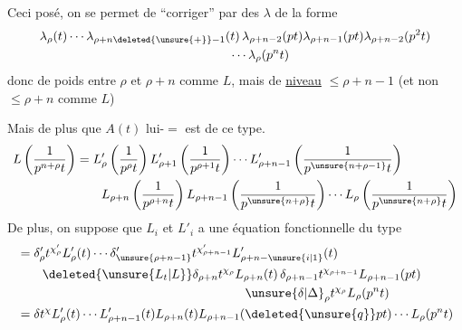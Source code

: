 Ceci posé, on  se permet de ``corriger'' par des $\lambda$  de la forme
\[
\begin{aligned}
&\lambda_{\rho}(t)\cdots\lambda_{\rho+n\deleted{\unsure{+}}-1}(t)\,\lambda_{\rho+n-2}(pt)\lambda_{\rho+n-1}(pt)\lambda_{\rho+n-2}(p^2t)\\
&\hspace{15em}\cdots\lambda_{\rho}(p^nt)
\end{aligned}
\]
donc de poids entre $\rho$ et $\rho+n$ comme $L$, mais de \uline{niveau} $\leq\rho+n-1$ (et non  $\leq\rho+n$ comme $L$)


Mais  de plus que $A(t)$ lui-$=$ est de  ce type.
\[
\begin{aligned}
L\left(\frac{1}{p^{n+\rho}t}\right)
 &=L'_{\rho}\left(\frac{1}{p^\rho t}\right)L'_{\rho+1}\left(\frac{1}{p^{\rho+1}t}\right)\cdots L'_{\rho+n-1}\left(\frac{1}{p^{\unsure{n+\rho-1}}t}\right)\\
 &\qquad L_{\rho+n}\left(\frac{1}{p^{\rho+n}t}\right)L_{\rho+n-1}\left(\frac{1}{p^{\unsure{n+\rho}}t}\right)\cdots L_{\rho}\left(\frac{1}{p^{\unsure{n+\rho}}t}\right)
\end{aligned}
\]
De plus, on suppose que  $L_i$ et $L'_i$ a une équation fonctionnelle du type 
\[
\begin{aligned}
&=\delta'_{\rho}t^{\chi'_{\rho}}L'_{\rho}(t)\cdots\delta'_{\unsure{\rho+n-1}}t^{\chi'_{\rho+n-1}}L'_{\rho+n-\unsure{i|1}}(t)\\
&\qquad \deleted{\unsure{L_t|L}}\delta_{\rho+n}t^{\chi_{\rho}}L_{\rho+n}(t)\,\delta_{\rho+n-1}t^{\chi_{\rho+n-1}}L_{\rho+n-1}(pt)\\
&\hspace{18em}\unsure{\delta|\Delta}_{\rho}t^{\chi_{\rho}}L_{\rho}(p^nt)\\
&=\delta t^\chi L'_{\rho}(t)\cdots L'_{\rho+n-1}(t)L_{\rho+n}(t)L_{\rho+n-1}(\deleted{\unsure{q}}pt)\cdots L_{\rho}(p^nt)
\end{aligned}
\]

